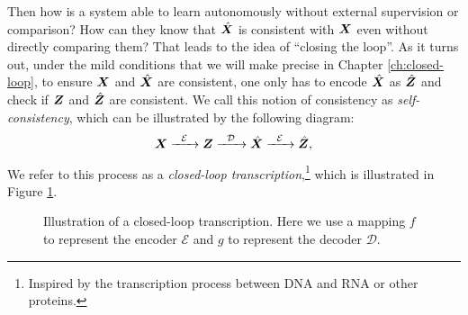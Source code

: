 \documentclass[../../book-main.tex]{subfiles}
\begin{document}
Then how is a system able to learn autonomously without external supervision or comparison? How can they know that $\hat {\bm{X}}$ is consistent with $\bm{X}$ even without directly comparing them? That leads to the idea of ``closing the loop''. As it turns out, under the mild conditions that we will make precise in Chapter \ref{ch:closed-loop}, to ensure $\bm{X}$ and $\hat {\bm{X}}$ are consistent, one only has to encode $\hat {\bm{X}}$ as $\hat {\bm{Z}}$ and check if $\bm{Z}$ and $\hat {\bm{Z}}$ are consistent. We call this notion of consistency as {\em self-consistency}, which  can be illustrated by the following diagram:
\begin{equation}
    \bm{X}   \xrightarrow{\hspace{2mm} \mathcal{E}\hspace{2mm}} \bm{Z}  \xrightarrow{\hspace{2mm} \mathcal{D} \hspace{2mm}} \hat {\bm{X}} \xrightarrow{\hspace{2mm} \mathcal{E}\hspace{2mm}} \hat {\bm{Z}},
    \label{eqn:closed-loop}
\end{equation}
We refer to this process as a {\em closed-loop transcription},\footnote{Inspired by the transcription process between DNA and RNA or other proteins.} which is illustrated in Figure \ref{fig:closed-loop}.

\begin{figure}[t]
\caption{Illustration of a closed-loop transcription. Here we use a mapping $f$ to represent the encoder $\mathcal{E}$ and $g$ to represent the decoder $\mathcal{D}$.}  \label{fig:closed-loop}
\end{figure}
\end{document}
